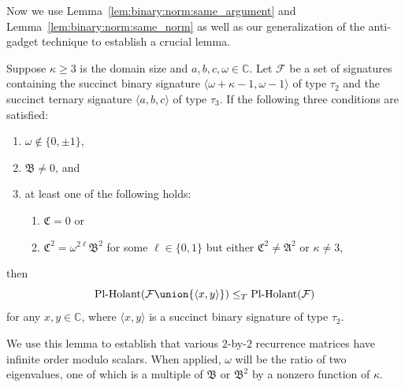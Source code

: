 \documentclass[11pt]{article}
\newcommand{\PlHolant}{\operatorname{Pl-Holant}}
\begin{document}
Now we use Lemma~\ref{lem:binary:norm:same_argument} and Lemma~\ref{lem:binary:norm:same_norm}
as well as our generalization of the anti-gadget technique to establish a crucial lemma.

\begin{lemma} \label{lem:binary:general:root_of_unity}
 Suppose $\kappa \ge 3$ is the domain size and $a,b,c,\omega \in \mathbb{C}$.
 Let $\mathcal{F}$ be a set of signatures containing the succinct binary signature $\langle \omega + \kappa - 1, \omega - 1 \rangle$ of type $\tau_2$
 and the succinct ternary signature $\langle a,b,c \rangle$ of type $\tau_3$.
 If the following three conditions are satisfied:
 \begin{enumerate}
  \item $\omega \not\in \{0, \pm 1\}$, \label{condition:lem:binary:general:omega}
  \item $\mathfrak{B} \ne 0$, and \label{condition:lem:binary:general:a+(k-3)b-(k-2)c!=0}
  \item at least one of the following holds: \label{condition:lem:binary:general:two_cases}
  \begin{enumerate}[label=(\roman*)]
   \item $\mathfrak{C} = 0$ or \label{case:lem:binary:general:frakC=0}
   \item $\mathfrak{C}^2 = \omega^{2 \ell} \mathfrak{B}^2$ for some $\ell \in \{0,1\}$ but either $\mathfrak{C}^2 \ne \mathfrak{A}^2$ or $\kappa \ne 3$, \label{case:lem:binary:general:frakC^2=w^(2ell)frakB^2}
  \end{enumerate}
 \end{enumerate}
 then
 \[
  \PlHolant(\mathcal{F} \union \{\langle x,y \rangle\}) \le_T \PlHolant(\mathcal{F})
 \]
 for any $x,y\in \mathbb{C}$,
 where $\langle x,y \rangle$ is a succinct binary signature of type $\tau_2$.
\end{lemma}

We use this lemma to establish that various $2$-by-$2$ recurrence matrices have infinite order modulo scalars.
When applied,
$\omega$ will be the ratio of two eigenvalues,
one of which is a multiple of $\mathfrak{B}$ or $\mathfrak{B}^2$ by a nonzero function of $\kappa$.
\end{document}
